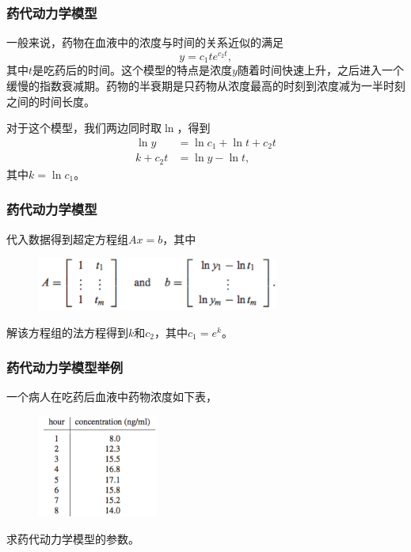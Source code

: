 \documentclass[10pt]{beamer}
\begin{document}
\begin{frame}
\frametitle{药代动力学模型}
一般来说，药物在血液中的浓度与时间的关系近似的满足
\begin{equation}
y = c_1 t e^{c_2 t},
\end{equation}
其中$t$是吃药后的时间。这个模型的特点是浓度$y$随着时间快速上升，之后进入一个缓慢的指数衰减期。药物的半衰期是只药物从浓度最高的时刻到浓度减为一半时刻之间的时间长度。

\vspace{0.2cm}

对于这个模型，我们两边同时取$\ln$，得到
\begin{align}
\ln y &= \ln c_1 + \ln t + c_2 t \nonumber \\
k + c_2 t &= \ln y - \ln t,
\end{align}
其中$k = \ln c_1$。
\end{frame}


\begin{frame}
\frametitle{药代动力学模型}
代入数据得到超定方程组$Ax = b$，其中
\begin{figure}
\includegraphics[width=8cm]{figs/4-2-2_Drug_Concentration-1} 
\end{figure}
解该方程组的法方程得到$k$和$c_2$，其中$c_1 = e^k$。
\end{frame}


\begin{frame}
\frametitle{药代动力学模型举例}
\begin{example}
一个病人在吃药后血液中药物浓度如下表，
\begin{figure}
\includegraphics[width=4cm]{figs/4-2-2_Drug_Concentration-2} 
\end{figure}
求药代动力学模型的参数。
\end{example}
\end{frame}
\end{document}
